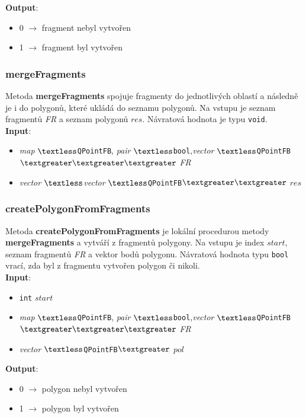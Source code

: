 \documentclass[a4paper, 12pt]{article}
\begin{document}
\textbf{Output}:
\begin{itemize}
\item 0 $\rightarrow$ fragment nebyl vytvořen 
\item 1 $\rightarrow$ fragment byl vytvořen 
\end{itemize}

\subsubsection*{mergeFragments}
Metoda \textbf{mergeFragments} spojuje fragmenty do jednotlivých oblastí a následně je i do polygonů, které ukládá do seznamu polygonů.  Na vstupu je seznam fragmentů \textit{FR} a sez\-nam polygonů $res$. Návratová hodnota je typu \texttt{void}.\\ 

\textbf{Input}:
\begin{itemize}
\item \textsl{map} $\textless$\texttt{QPointFB}, \textsl{pair} $\textless$\texttt{bool},\textsl{vector} $\textless$\texttt{QPointFB}$\textgreater \textgreater \textgreater$ \textit{FR}
\item \textsl{vector} $\textless$\textsl{vector} $\textless$\texttt{QPointFB}$\textgreater \textgreater$ $res$
\end{itemize}

\subsubsection*{createPolygonFromFragments}
Metoda \textbf{createPolygonFromFragments} je lokální procedurou metody \textbf{mergeFragments} a vytváří z fragmentů polygony. Na vstupu je index $start$, seznam fragmentů \textit{FR} a vektor bodů polygonu. Návratová hodnota typu \texttt{bool} vrací, zda byl z fragmentu vytvořen polygon či nikoli.\\

\textbf{Input}:
\begin{itemize}
\item \texttt{int} $start$ 
\item \textsl{map} $\textless$\texttt{QPointFB}, \textsl{pair} $\textless$\texttt{bool},\textsl{vector} $\textless$\texttt{QPointFB}$\textgreater \textgreater \textgreater$ \textit{FR}
\item \textsl{vector} $\textless$\texttt{QPointFB}$\textgreater$ $pol$
\end{itemize}

\textbf{Output}:
\begin{itemize}
\item 0 $\rightarrow$ polygon nebyl vytvořen 
\item 1 $\rightarrow$ polygon byl vytvořen 
\end{itemize}
\end{document}
